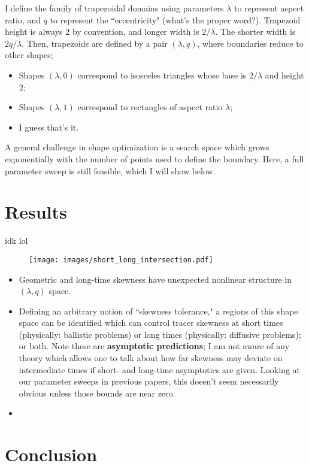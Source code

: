 \documentclass{amsart}
\begin{document}
I define the family of trapezoidal domains using parameters $\lambda$ 
to represent aspect ratio, and $q$ to represent the ``eccentricity" 
(what's the proper word?). Trapezoid height is always $2$ by convention, 
and longer width is $2/\lambda$. The shorter width is $2q/\lambda$. 
Then, trapezoids are defined by a pair $(\lambda,q)$, where boundaries 
reduce to other shapes;
%
\begin{itemize}
\item Shapes $(\lambda,0)$ correspond to isosceles triangles whose base is 
$2/\lambda$ and height $2$;
\item Shapes $(\lambda,1)$ correspond to rectangles of aspect ratio $\lambda$;
\item I guess that's it.
\end{itemize}
%
A general challenge in shape optimization is a search space which 
grows exponentially with the number of points used to define the 
boundary. Here, a full parameter sweep is still feasible, 
which I will show below.

\section{Results}
idk lol

\begin{figure}
\texttt{[image: images/short\_long\_intersection.pdf]}
\end{figure}

\begin{itemize}
\item Geometric and long-time skewness have unexpected nonlinear 
structure in $(\lambda,q)$ space.
\item Defining an arbitrary notion of ``skewness tolerance," a 
regions of this shape space can be identified which can control 
tracer skewness at short times (physically: ballistic problems) 
or long times (physically: diffusive problems); or both. Note these are 
\textbf{asymptotic predictions}; I am not aware of any theory 
which allows one to talk about how far skewness may deviate 
on intermediate times if short- and long-time asymptotics are 
given. Looking at our parameter sweeps in previous papers, 
this doesn't seem necessarily obvious unless those bounds are 
near zero.
\item 
\end{itemize}

\section{Conclusion}
\lipsum[1]
\end{document}
